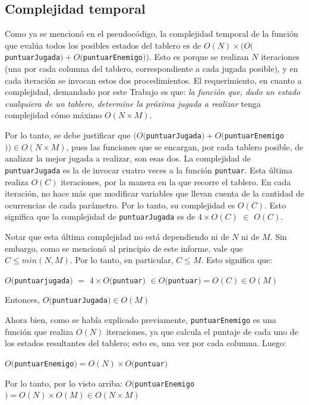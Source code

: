 \documentclass[12pt,a4paper]{article}
\begin{document}
    
    \subsection{Complejidad temporal}
    
    Como ya se mencionó en el pseudocódigo, la complejidad temporal de la función que evalúa todos los posibles estados del tablero es de $O(N) \times (O($\texttt{puntuarJugada}$) + O($\texttt{puntuarEnemigo}$))$. Esto es porque se realizan $N$ iteraciones (una por cada columna del tablero, correspondiente a cada jugada posible), y en cada iteración se invocan estos dos procedimientos. El requerimiento, en cuanto a complejidad, demandado por este Trabajo es que: \textit{la función que, dado un estado cualquiera de un tablero, determine la próxima jugada a realizar} tenga complejidad cómo máximo $O(N \times M)$. 
    
    Por lo tanto, se debe justificar que $(O($\texttt{puntuarJugada}$) + O($\texttt{puntuarEnemigo}$)) \in O(N \times M)$, pues las funciones que se encargan, por cada tablero posible, de analizar la mejor jugada a realizar, son esas dos. La complejidad de \texttt{puntuarJugada} es la de invocar cuatro veces a la función \texttt{puntuar}. Esta última realiza $O(C)$ iteraciones, por la manera en la que recorre el tablero. En cada iteración, no hace más que modificar variables que llevan cuenta de la cantidad de ocurrencias de cada parámetro. Por lo tanto, su complejidad es $O(C)$. Esto significa que la complejidad de \texttt{puntuarJugada} es de $4\times O(C)$ $\in$ $O(C)$.
    
    Notar que esta última complejidad no está dependiendo ni de $N$ ni de $M$. Sin embargo, como se mencionó al principio de este informe, vale que $C \leq min(N, M)$. Por lo tanto, en particular, $C \leq M$. Esto significa que:
    
    \begin{center}
        $O($\texttt{puntuarjugada}$)$ $=$ $4 \times O($\texttt{puntuar}$)$ $\in O($\texttt{puntuar}$) = O(C) \in O(M)$
        
        Entonces, $O($\texttt{puntuarJugada}$) \in O(M)$
    \end{center}
    
    Ahora bien, como se había explicado previamente, \texttt{puntuarEnemigo} es una función que realiza $O(N)$ iteraciones, ya que calcula el puntaje de cada uno de los estados resultantes del tablero; esto es, una vez por cada columna. Luego:
    
    \begin{center}
        $O($\texttt{puntuarEnemigo}$) = O(N) \times O($\texttt{puntuar}$)$
        
        Por lo tanto, por lo visto arriba: $O($\texttt{puntuarEnemigo}$) = O(N) \times O(M) \in O(N \times M)$
    \end{center}
    
\end{document}
